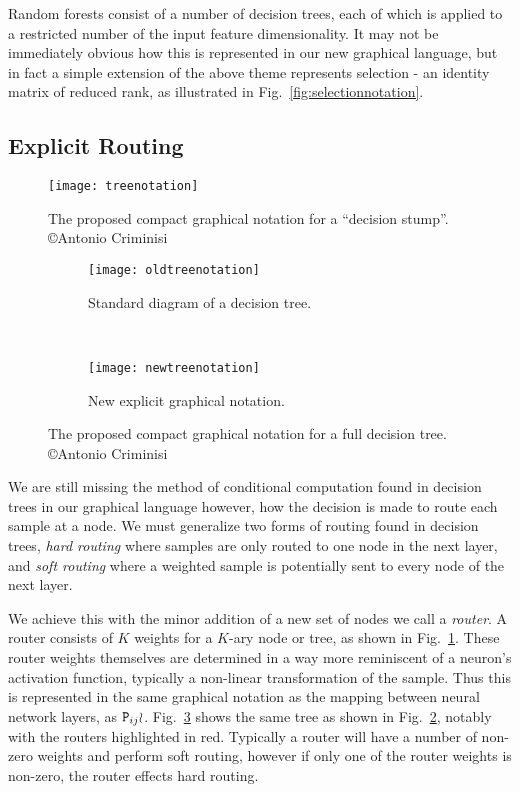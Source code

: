 \documentclass[thesis]{subfiles}
\begin{document}
Random forests consist of a number of decision trees, each of which is applied to a restricted number of the input feature dimensionality. It may not be immediately obvious how this is represented in our new graphical language, but in fact a simple extension of the above theme represents selection - \ie an identity matrix of reduced rank, as illustrated in Fig.~\ref{fig:selectionnotation}.

\subsection{Explicit Routing}
\begin{figure}[htbp!] 
\centering
\texttt{[image: treenotation]}
\caption{The proposed compact graphical notation for a ``decision stump''. \copyright Antonio Criminisi}
\label{fig:treeNotation}
\end{figure}

\begin{figure}[htbp!] 
\centering
\begin{subfigure}[b]{0.4\textwidth}
   \centering
   \texttt{[image: oldtreenotation]}
   \caption{Standard diagram of a decision tree.}
   \label{fig:oldtreenotation}
\end{subfigure}
~
\begin{subfigure}[b]{0.4\textwidth}
   \centering
   \texttt{[image: newtreenotation]}
   \caption{New explicit graphical notation.}
   \label{fig:newtreenotation}
\end{subfigure}
\caption{The proposed compact graphical notation for a full decision tree. \copyright Antonio Criminisi}
\label{fig:complexDecisionTree}
\end{figure}

We are still missing the method of conditional computation found in decision trees in our graphical language however, \ie how the decision is made to route each sample at a node. We must generalize two forms of routing found in decision trees, \emph{hard routing} where samples are only routed to one node in the next layer, and \emph{soft routing} where a weighted sample is potentially sent to every node of the next layer.

We achieve this with the minor addition of a new set of nodes we call a \emph{router}. A router consists of $K$ weights for a $K$-ary node or tree, as shown in Fig.~\ref{fig:treeNotation}. These router weights themselves are determined in a way more reminiscent of a neuron's activation function, typically a non-linear transformation of the sample. Thus this is represented in the same graphical notation as the mapping between neural network layers, \ie as $\mat P_{ij} \wr$. Fig.~\ref{fig:newtreenotation} shows the same tree as shown in Fig.~\ref{fig:oldtreenotation}, notably with the routers highlighted in red. Typically a router will have a number of non-zero weights and perform soft routing, however if only one of the router weights is non-zero, the router effects hard routing.
\end{document}
